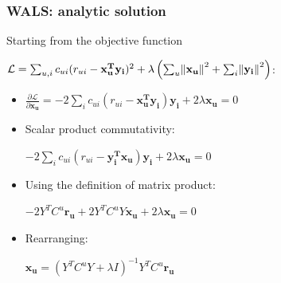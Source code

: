 \documentclass[xcolor = {table}]{beamer}
\begin{document}
  \begin{frame}\label{math.aux}
    \frametitle{WALS: analytic solution}

    Starting from the objective function

    \begin{center}
      $\mathcal{L} = \sum_{u, i} c_{ui} (r_{ui} - \mathbf{x_u^T y_i})^2 + \lambda \left( \sum_u \norm{\mathbf{x_u}}^2 + \sum_i \norm{\mathbf{y_i}}^2 \right)$:
    \end{center}

    \vspace{1em}

    \begin{itemize}
      \setlength\itemsep{1em}
      \item $\frac{\partial \mathcal{L}}{\partial \mathbf{x_u}} = -2\sum_i c_{ui}(r_{ui} - \mathbf{x_u^T y_i}) \mathbf{y_i} + 2\lambda \mathbf{x_u} = 0$
      \item Scalar product commutativity:
        \vspace{0.3em}
        \begin{center}
          $-2\sum_i c_{ui}(r_{ui} - \mathbf{y_i^T x_u}) \mathbf{y_i} + 2\lambda \mathbf{x_u} = 0$
        \end{center}
      \item Using the definition of matrix product:
        \vspace{0.3em}
        \begin{center}
          $-2Y^TC^u\mathbf{r_u}+2Y^TC^uY\mathbf{x_u}+2\lambda \mathbf{x_u} = 0$
        \end{center}
      \item Rearranging:
        \vspace{0.3em}
        \begin{center}
          $\mathbf{x_u} = (Y^TC^uY + \lambda I)^{-1}Y^TC^u\mathbf{r_u}$
        \end{center}
    \end{itemize}

  \end{frame}


  \backupend
\end{document}
